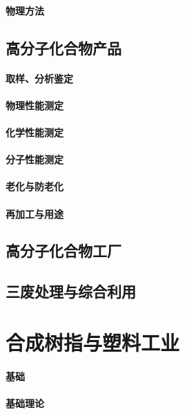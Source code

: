 \documentclass[UTF8]{../../ApplicationUniverse}
\begin{document}
        \subsubsection{物理方法}
\section{高分子化合物产品}
    \subsubsection{取样、分析鉴定}
    \subsubsection{物理性能测定}
    \subsubsection{化学性能测定}
    \subsubsection{分子性能测定}
    \subsubsection{老化与防老化}
    \subsubsection{再加工与用途}
\section{高分子化合物工厂}
\section{三废处理与综合利用}






\chapter{合成树指与塑料工业}
\subsubsection{基础}
    \subsubsection{基础理论}
\end{document}
